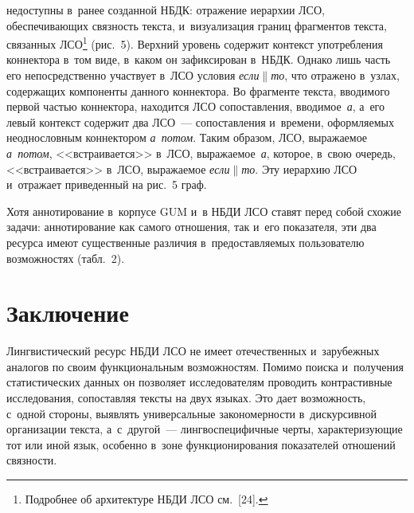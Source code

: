 \begin{multicols}{2}

\noindent
 недоступны в~ранее создан\-ной 
НБДК: отражение иерархии ЛСО, обес\-пе\-чи\-ва\-ющих связ\-ность текс\-та, 
и~визуализация границ фраг\-мен\-тов текс\-та, связанных ЛСО\footnote[1]{Подробнее 
об архитектуре НБДИ ЛСО см.~[24].} (рис.~5). Верхний уровень содержит 
контекст употребления коннектора в~том виде, в~каком он зафиксирован в~НБДК. 
Однако лишь часть его непосредственно участвует в~ЛСО условия 
\textit{если}$\|$\textit{то}, что отражено в~узлах, содержащих компоненты данного 
коннектора. Во фрагменте текс\-та, вводимого первой частью коннектора, находится 
ЛСО сопоставления, вводимое~\textit{а}, а~его левый контекст содержит два  
ЛСО~--- со\-по\-став\-ле\-ния и~времени, оформ\-ля\-емых неоднословным коннектором 
\textit{а~потом}. Таким образом, ЛСО, выражаемое \textit{а~потом}, 
<<встраивается>> в~ЛСО, вы\-ра\-жа\-емое~\textit{а}, которое, в~свою очередь, 
<<встраивается>> в~ЛСО, вы\-ра\-жа\-емое \textit{если}$\|$\textit{то}. Эту иерархию 
ЛСО и~отражает приведенный на рис.~5 граф.



    Хотя аннотирование в~корпусе GUM и~в НБДИ ЛСО ставят перед собой схожие 
задачи: аннотирование как самого отношения, так и~его показателя, эти два 
ресурса имеют существенные различия в~предостав\-ля\-емых пользователю 
воз\-мож\-но\-стях (табл.~2).

\vspace*{-6pt}


\section{Заключение}

\vspace*{-2pt}

  Лингвистический ресурс НБДИ ЛСО не имеет отечественных и~зарубежных 
аналогов по своим функциональным возможностям. Помимо поиска и~получения 
статистических данных он поз\-во\-ля\-ет исследователям проводить контрастивные 
исследования, со\-по\-став\-ляя текс\-ты на двух языках. Это дает воз\-мож\-ность, с~одной 
стороны, вы\-яв\-лять универсальные закономерности в~дискурсивной организации 
текста, а~с~другой~--- лингвоспецифичные черты, ха\-рак\-те\-ри\-зу\-ющие тот или 
иной язык, особенно в~зоне функционирования показателей отношений связ\-ности.

\vspace*{-6pt}
  

\end{multicols}
